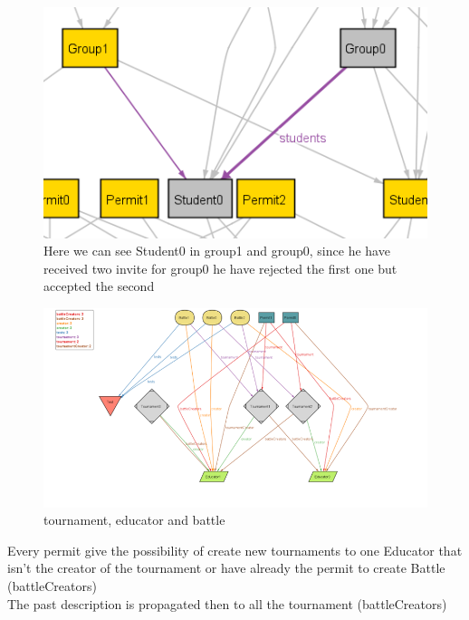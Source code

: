 \documentclass{article}
\begin{document}
{\begin{figure}[H]
        \label{fig:receiving invite}
    \end{figure}
    \begin{figure}[H]
        \centering
        \includegraphics{images/ALLOY/students.png}
        \caption{Here we can see Student0 in group1 and group0, since he have received two invite for group0 he have rejected the first one but accepted the second}
        \label{fig:receiving invite}
    \end{figure}
    \begin{figure}[H]
        \centering
        \hspace*{-3cm}\includegraphics[scale=1.]{images/ALLOY/Picture2.png}
        \caption{tournament, educator and battle}
        \label{fig:tournament, educator and battle}
    \end{figure}
    \color{red}
    Every permit give the possibility of create new tournaments to one Educator that isn't the creator of the tournament or have already the permit to create Battle (battleCreators)\\
    \color{brown}
    The past description is propagated then to all the tournament (battleCreators)\\
    \color{orange}
}
\end{document}
